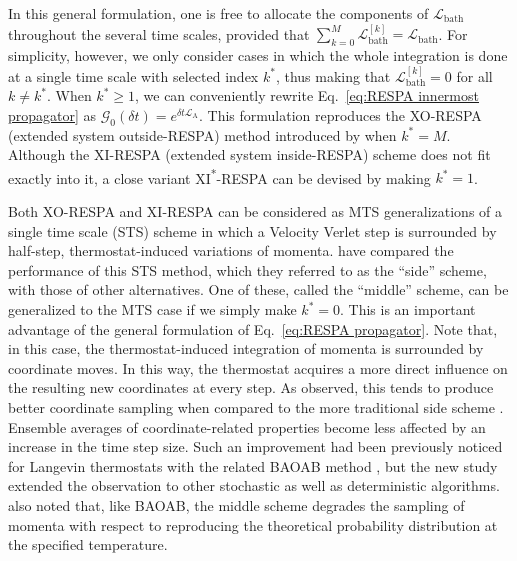 \documentclass[
aip,
jcp,
reprint,
]{revtex4-1}
\newcommand{\Liu}{\mathcal{L}}
\begin{document}
In this general formulation, one is free to allocate the components of $\Liu_\mathrm{bath}$ throughout the several time scales, provided that $\sum_{k=0}^M \Liu_\mathrm{bath}^{[k]} = \Liu_\mathrm{bath}$.
For simplicity, however, we only consider cases in which the whole integration is done at a single time scale with selected index $k^\ast$, thus making that $\Liu_\mathrm{bath}^{[k]} = 0$ for all $k \neq k^\ast$.
When $k^\ast \geq 1$, we can conveniently rewrite Eq.~\eqref{eq:RESPA innermost propagator} as $\mathcal{G}_0(\delta t) = e^{\delta t \Liu_\mathrm{A}}$.
This formulation reproduces the XO-RESPA (extended system outside-RESPA) method introduced by \citeauthor{Martyna_1996} \cite{Martyna_1996} when $k^\ast = M$.
Although the XI-RESPA (extended system inside-RESPA) scheme \cite{Martyna_1996} does not fit exactly into it, a close variant XI\textsuperscript{*}-RESPA can be devised by making $k^\ast = 1$.

Both XO-RESPA and XI-RESPA can be considered as MTS generalizations of a single time scale (STS) scheme in which a Velocity Verlet step is surrounded by half-step, thermostat-induced variations of momenta.
\citeauthor{Zhang_2017} \cite{Zhang_2017} have compared the performance of this STS method, which they referred to as the ``side'' scheme, with those of other alternatives.
One of these, called the ``middle'' scheme, can be generalized to the MTS case if we simply make $k^\ast = 0$.
This is an important advantage of the general formulation of Eq.~\eqref{eq:RESPA propagator}.
Note that, in this case, the thermostat-induced integration of momenta is surrounded by coordinate moves.
In this way, the thermostat acquires a more direct influence on the resulting new coordinates at every step.
As \citeauthor{Zhang_2017} observed, this tends to produce better coordinate sampling when compared to the more traditional side scheme \cite{Zhang_2017}.
Ensemble averages of coordinate-related properties become less affected by an increase in the time step size.
Such an improvement had been previously noticed for Langevin thermostats with the related BAOAB method \cite{Leimkuhler_2012a, Leimkuhler_2013b}, but the new study extended the observation to other stochastic as well as deterministic algorithms.
\citeauthor{Zhang_2017} \cite{Zhang_2017} also noted that, like BAOAB, the middle scheme degrades the sampling of momenta with respect to reproducing the theoretical probability distribution at the specified temperature.
\end{document}
